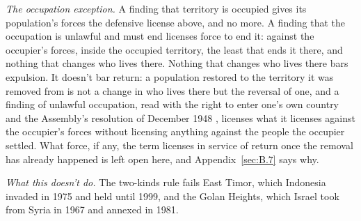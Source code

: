 \emph{The occupation exception.} A finding that territory is occupied gives its population's forces the defensive license above, and no more. A finding that the occupation is unlawful and must end licenses force to end it: against the occupier's forces, inside the occupied territory, the least that ends it there, and nothing that changes who lives there.
Nothing that changes who lives there bars expulsion. It doesn't bar return: a population restored to the territory it was removed from is not a change in who lives there but the reversal of one, and a finding of unlawful occupation, read with the right to enter one's own country and the Assembly's resolution of December 1948 \autocite{unga194}, licenses what it licenses against the occupier's forces without licensing anything against the people the occupier settled. What force, if any, the term licenses in service of return once the removal has already happened is left open here, and Appendix~\ref{sec:B.7} says why.

\emph{What this doesn't do.} The two-kinds rule fails East Timor, which Indonesia invaded in 1975 and held until 1999, and the Golan Heights, which Israel took from Syria in 1967 and annexed in 1981.
